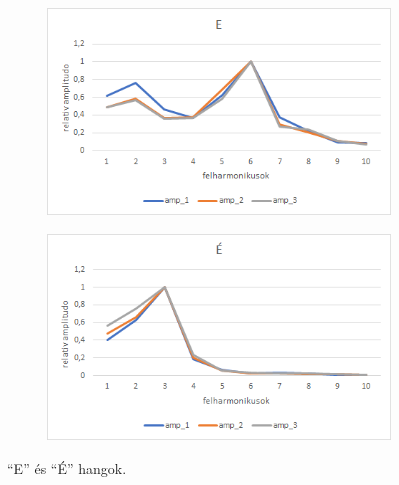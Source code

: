\documentclass[a4paper,12pt]{article}
\begin{document}
\begin{figure}[h!]
\begin{subfigure}[t]{.5\linewidth}
\centering
\includegraphics[width = \linewidth]{E.png}
\end{subfigure}%
\begin{subfigure}[t]{.5\linewidth}
\centering
\includegraphics[width = \linewidth]{E_1.png}
\end{subfigure}
\caption{``E'' és ``É'' hangok.}
\label{e_e}
\end{figure}
\end{document}
